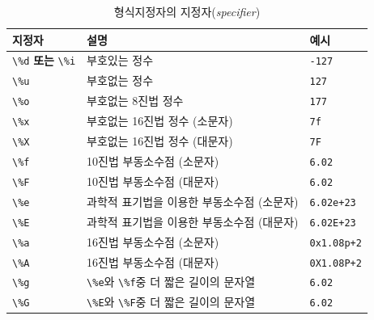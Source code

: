 \documentclass[a4paper,12pt]{book}
\newcommand{\V}[1]{\Verb|#1|}
\begin{document}
    \begin{longtable}{ || m{6em} || m{17em} | m{6em} || }
        \caption{형식지정자의 지정자(\textit{specifier})}
        \label{Tab:format-specifier}

        \hline 지정자                        & 설명                                                                 & 예시 \\
        \hline
        \hline \V{\%d} \textbf{또는} \V{\%i} & 부호있는 정수                                                        & \V{-127} \\
        \hline \V{\%u}                       & 부호없는 정수                                                        & \V{127} \\
        \hline \V{\%o}                       & 부호없는 8진법 정수                                                  & \V{177} \\
        \hline \V{\%x}                       & 부호없는 16진법 정수 (소문자)                                        & \V{7f} \\
        \hline \V{\%X}                       & 부호없는 16진법 정수 (대문자)                                        & \V{7F} \\
        \hline \V{\%f}                       & 10진법 부동소수점 (소문자)                                           & \V{6.02} \\
        \hline \V{\%F}                       & 10진법 부동소수점 (대문자)                                           & \V{6.02} \\
        \hline \V{\%e}                       & 과학적 표기법을 이용한 부동소수점 (소문자)                           & \V{6.02e+23} \\
        \hline \V{\%E}                       & 과학적 표기법을 이용한 부동소수점 (대문자)                           & \V{6.02E+23} \\
        \hline \V{\%a}                       & 16진법 부동소수점 (소문자)                                           & \V{0x1.08p+2} \\
        \hline \V{\%A}                       & 16진법 부동소수점 (대문자)                                           & \V{0X1.08P+2} \\
        \hline \V{\%g}                       & \V{\%e}와 \V{\%f}중 더 짧은 길이의 문자열                            & \V{6.02} \\
        \hline \V{\%G}                       & \V{\%E}와 \V{\%F}중 더 짧은 길이의 문자열                            & \V{6.02} \\

\end{longtable}
\end{document}
